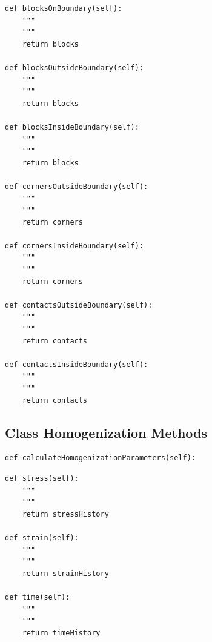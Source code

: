 \begin{lstlisting}[frame=single] 
def blocksOnBoundary(self):
	"""
	"""
	return blocks

def blocksOutsideBoundary(self):
	"""
	"""
	return blocks
        
def blocksInsideBoundary(self):
	"""
	"""
	return blocks
            
def cornersOutsideBoundary(self):
	"""
	"""
	return corners
	
def cornersInsideBoundary(self):
	"""
	"""
	return corners
	
def contactsOutsideBoundary(self):
	"""
	"""
	return contacts
	
def contactsInsideBoundary(self):
	"""
	"""
	return contacts
\end{lstlisting}
    
\subsection{Class Homogenization Methods}

\begin{lstlisting}[frame=single]                
def calculateHomogenizationParameters(self):
\end{lstlisting}

                   
\begin{lstlisting}[frame=single]                
def stress(self):
	"""
	"""
	return stressHistory
	
def strain(self):
	"""
	"""
	return strainHistory

def time(self):
	"""
	"""
	return timeHistory
\end{lstlisting}